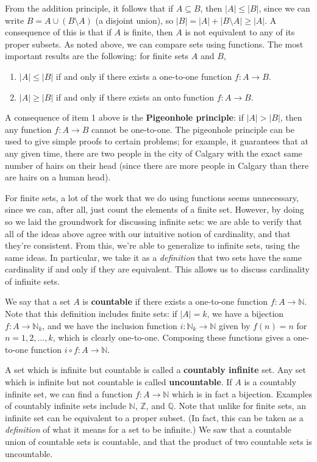 \documentclass[letterpaper,12pt]{article}
\newcommand{\N}{\mathbb{N}}
\newcommand{\Z}{\mathbb{Z}}
\newcommand{\Q}{\mathbb{Q}}
\begin{document}
From the addition principle, it follows that if $A\subseteq B$, then $|A|\leq |B|$, since we can write $B = A\cup (B\setminus A)$ (a disjoint union), so $|B|=|A|+|B\setminus A|\geq |A|$. A consequence of this is that if $A$ is finite, then $A$ is not equivalent to any of its proper subsets. As noted above, we can compare sets using functions. The most important results are the following: for finite sets $A$ and $B$,
\begin{enumerate}
 \item $|A|\leq |B|$ if and only if there exists a one-to-one function $f:A\to B$.
 \item $|A|\geq |B|$ if and only if there exists an onto function $f:A\to B$.
\end{enumerate}
A consequence of item 1 above is the {\bf Pigeonhole principle}: if $|A|>|B|$, then any function $f:A\to B$ cannot be one-to-one. The pigeonhole principle can be used to give simple proofs to certain problems; for example, it guarantees that at any given time, there are two people in the city of Calgary with the exact same number of hairs on their head (since there are more people in Calgary than there are hairs on a human head).

For finite sets, a lot of the work that we do using functions seems unnecessary, since we can, after all, just count the elements of a finite set. However, by doing so we laid the groundwork for discussing infinite sets: we are able to verify that all of the ideas above agree with our intuitive notion of cardinality, and that they're consistent. From this, we're able to generalize to infinite sets, using the same ideas. In particular, we take it as a {\em definition} that two sets have the same cardinality if and only if they are equivalent. This allows us to discuss cardinality of infinite sets.

We say that a set $A$ is {\bf countable} if there exists a one-to-one function $f:A\to\N$. Note that this definition includes finite sets: if $|A|=k$, we have a bijection $f:A\to \N_k$, and we have the inclusion function $i:\N_k\to\N$ given by $f(n)=n$ for $n=1,2,\ldots, k$, which is clearly one-to-one. Composing these functions gives a one-to-one function $i\circ f:A\to\N$.

A set which is infinite but countable is called a {\bf countably infinite} set. Any set which is infinite but not countable is called {\bf uncountable}. If $A$ is a countably infinite set, we can find a function $f:A\to\N$ which is in fact a bijection. Examples of countably infinite sets include $\N$, $\Z$, and $\Q$. Note that unlike for finite sets, an infinite set can be equivalent to a proper subset. (In fact, this can be taken as a {\em definition} of what it means for a set to be infinite.) We saw that a countable union of countable sets is countable, and that the product of two countable sets is uncountable.
\end{document}
